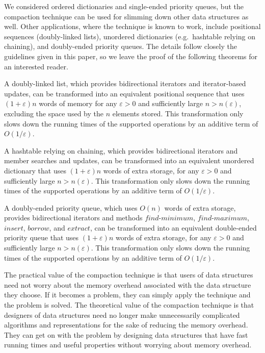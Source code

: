 \documentclass{DIKU-article}
\newcommand{\Findmin}{\mbox{$\mathit{find}$\textnormal{-}}\allowbreak{}\mbox{$\mathit{minimum}$}}
\newcommand{\Findmax}{\mbox{$\mathit{find}$\textnormal{-}}\allowbreak{}\mbox{$\mathit{maximum}$}}
\newcommand{\Insert}{\mbox{$\mathit{insert}$}}
\newcommand{\Extract}{\mbox{$\mathit{extract}$}}
\newcommand{\Borrow}{\mbox{$\mathit{borrow}$}}
\begin{document}
We considered ordered dictionaries and single-ended priority queues,
but the compaction technique can be used for slimming down other data
structures as well. Other applications, where the technique is known
to work, include positional sequences (doubly-linked lists), unordered
dictionaries (e.g.~hashtable relying on chaining), and doubly-ended
priority queues.  The details follow closely the guidelines given in
this paper, so we leave the proof of the following theorems for an
interested reader.

\begin{theorem}
A doubly-linked list, which provides bidirectional iterators and
iterator-based updates, can be transformed into an equivalent
positional sequence that uses $(1 + \varepsilon)n$ words of memory for
any $\varepsilon > 0$ and sufficiently large $n > n(\varepsilon)$,
excluding the space used by the $n$ elements stored. This
transformation only slows down the running times of the supported
operations by an additive term of $O(1/\varepsilon)$.
\end{theorem}

\begin{theorem}
A hashtable relying on chaining, which provides bidirectional
iterators and member searches and updates, can be transformed into an
equivalent unordered dictionary that uses $(1 + \varepsilon)n$ words
of extra storage, for any $\varepsilon > 0$ and sufficiently large $n
> n(\varepsilon)$.  This transformation only slows down the running
times of the supported operations by an additive term of
$O(1/\varepsilon)$.
\end{theorem}

\begin{theorem}
A doubly-ended priority queue, which uses $O(n)$ words of extra
storage, provides bidirectional iterators and methods \Findmin{},
\Findmax{}, \Insert{}, \Borrow{}, and \Extract{}, can be transformed
into an equivalent double-ended priority queue that uses $(1 +
\varepsilon)n$ words of extra storage, for any $\varepsilon > 0$ and
sufficiently large $n > n(\varepsilon)$.  This transformation only
slows down the running times of the supported operations by an
additive term of $O(1/\varepsilon)$.
\end{theorem}

The practical value of the compaction technique is that users of data
structures need not worry about the memory overhead associated with
the data structure they choose.  If it becomes a problem, they can
simply apply the technique and the problem is solved.  The theoretical
value of the compaction technique is that designers of data structures
need no longer make unnecessarily complicated algorithms and
representations for the sake of reducing the memory overhead.  They
can get on with the problem by designing data structures that have
fast running times and useful properties without worrying about
memory overhead.




\end{document}
